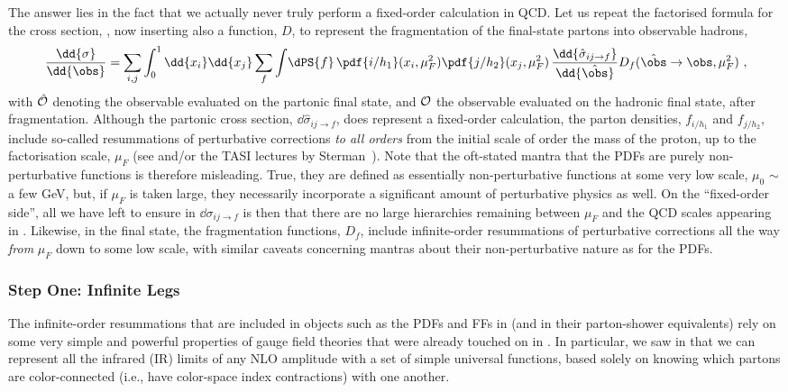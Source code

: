 The answer lies in the fact that we actually never truly perform a fixed-order
calculation in QCD. Let us repeat the factorised formula for the cross
section, , now inserting also a function, $D$,
to represent the fragmentation of the final-state partons into
observable hadrons, 
\begin{equation}
\frac{\dd{\sigma}}{\dd{\obs}} = 
\sum_{i,j}\int_{0}^{1}\dd{x_i}\dd{x_j}\sum_f\int\!\dPS{f}\,
\pdf{i/h_1}(x_i,\mu^2_F)\pdf{j/h_2}(x_j,\mu^2_F)\,\frac{\dd{\hat{\sigma}_{ij\to
      f}}}{\dd{\hat\obs}}D_f(\hat{\obs}\to\obs,\mu^2_F)~,
\label{eq:factorisation2}
\end{equation}
with $\hat{\cal O}$ denoting the observable evaluated on the partonic
final state, and ${\cal O}$ the observable evaluated on the
hadronic final state, after fragmentation. 
Although the partonic cross section, $\dd{\hat{\sigma}_{ij\to f}}$, 
does represent a fixed-order
calculation, the parton densities, $f_{i/h_1}$ and
$f_{j/h_2}$,  
include so-called resummations of perturbative corrections \emph{to
  all orders} from the initial scale of
order the mass of the proton, up to the factorisation scale, $\mu_F$
(see  and/or the TASI lectures by
Sterman~\cite{Sterman:1995fz}).  
Note that the oft-stated mantra that the PDFs are purely 
non-perturbative functions is therefore misleading.
 True, they are defined as essentially non-perturbative functions at
 some very low 
scale, $\mu_0$ $\sim$ a few GeV, but, 
if $\mu_F$ is taken large, they necessarily incorporate a
significant amount of perturbative physics as well.
On the ``fixed-order side'', all we have left to ensure in 
$\dd{\sigma_{ij\to f}}$ is then
that there are no large hierarchies remaining between $\mu_F$ and the
QCD scales appearing in . 
Likewise, in the final
state, the fragmentation functions, $D_f$, include infinite-order
resummations of perturbative corrections all the way \emph{from}
$\mu_F$ down to some low scale, with
similar caveats concerning mantras about their non-perturbative 
nature as for the PDFs. 

\subsubsection{Step One: Infinite Legs}
The infinite-order resummations that are 
included in objects such as the PDFs and FFs in
 (and in their parton-shower equivalents)
rely on some very simple and powerful
properties of gauge field theories that were already touched on
in . In particular, we saw
in 
that we can represent all the infrared (IR) limits of any NLO
amplitude with a set of simple universal functions, based solely
on knowing which partons are color-connected (i.e., have color-space
index contractions) with one another. 

